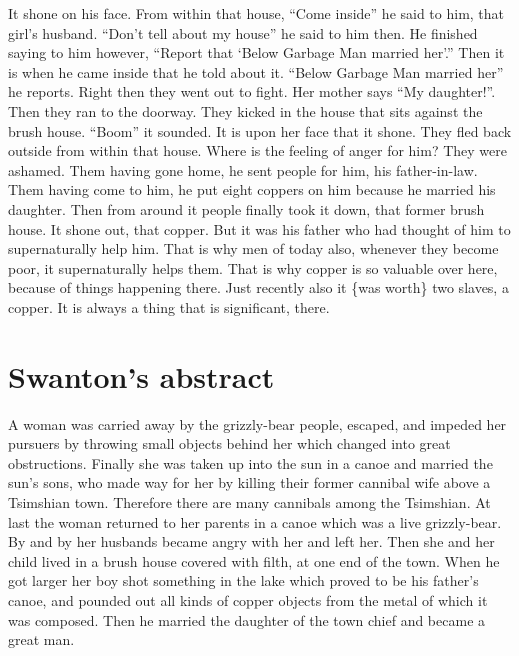\begin{pairs}
\begin{Rightside}
It shone on his face.
From within that house, “Come inside” he said to him, that girl’s husband.
“Don’t tell about my house” he said to him then.
He finished saying to him however,
“Report that ‘Below Garbage Man married her’.”
Then it is when he came inside that he told about it.
“Below Garbage Man married her” he reports.
Right then they went out to fight.
Her mother says “My daughter!”.
Then they ran to the doorway.
They kicked in the house that sits against the brush house.
\qqk{}“Boom” it sounded.
It is upon her face that it shone.
They fled back outside from within that house.
Where is the feeling of anger for him?
They were ashamed.
\pend
\pstart
{}Them having gone home, he sent people for him, his father-in-law.
Them having come to him, he put eight coppers on him because he married his daughter.
Then from around it people finally took it down, that former brush house.
It shone out, that copper.
But it was his father who had thought of him to supernaturally help him.
That is why men of today also, whenever they become poor, it supernaturally helps them.
That is why copper is so valuable over here, because of things happening there.
Just recently also it \{was worth\} two slaves, a copper.
It is always a thing that is significant, there.
\pend
\endnumbering
\end{Rightside}
\end{pairs}
\Columns

\vspace{1\baselineskip}

\section{Swanton’s abstract}\label{sec:89-swanton-abstract}

A woman was carried away by the grizzly-bear people, escaped, and impeded her pursuers by throwing small objects behind her which changed into great obstructions.
Finally she was taken up into the sun in a canoe and married the sun’s sons, who made way for her by killing their former cannibal wife above a Tsimshian town.
Therefore there are many cannibals among the Tsimshian.
At last the woman returned to her parents in a canoe which was a live grizzly-bear.
By and by her husbands became angry with her and left her.
Then she and her child lived in a brush house covered with filth, at one end of the town.
When he got larger her boy shot something in the lake which proved to be his father’s canoe, and pounded out all kinds of copper objects from the metal of which it was composed.
Then he married the daughter of the town chief and became a great man.

